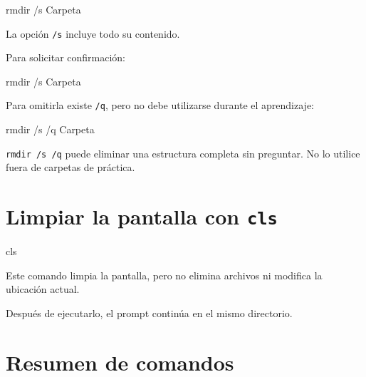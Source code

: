 \documentclass[
  spanish,
  letterpaper,
]{scrbook}
\newenvironment{Shaded}{\begin{snugshade}}{\end{snugshade}}
\newcommand{\AttributeTok}[1]{\textcolor[rgb]{0.40,0.45,0.13}{#1}}
\newcommand{\BuiltInTok}[1]{\textcolor[rgb]{0.00,0.23,0.31}{#1}}
\newcommand{\NormalTok}[1]{\textcolor[rgb]{0.00,0.23,0.31}{#1}}
\begin{document}
\begin{Shaded}
\begin{Highlighting}[]
\BuiltInTok{rmdir} \AttributeTok{/s}\NormalTok{ Carpeta}
\end{Highlighting}
\end{Shaded}

La opción \texttt{/s} incluye todo su contenido.

Para solicitar confirmación:

\begin{Shaded}
\begin{Highlighting}[]
\BuiltInTok{rmdir} \AttributeTok{/s}\NormalTok{ Carpeta}
\end{Highlighting}
\end{Shaded}

Para omitirla existe \texttt{/q}, pero no debe utilizarse durante el
aprendizaje:

\begin{Shaded}
\begin{Highlighting}[]
\BuiltInTok{rmdir} \AttributeTok{/s} \AttributeTok{/q}\NormalTok{ Carpeta}
\end{Highlighting}
\end{Shaded}

\texttt{rmdir\ /s\ /q} puede eliminar una estructura completa sin
preguntar. No lo utilice fuera de carpetas de práctica.


\chapter{\texorpdfstring{Limpiar la pantalla con
\texttt{cls}}{Limpiar la pantalla con cls}}\label{limpiar-la-pantalla-con-cls}

\begin{Shaded}
\begin{Highlighting}[]
\BuiltInTok{cls}
\end{Highlighting}
\end{Shaded}

Este comando limpia la pantalla, pero no elimina archivos ni modifica la
ubicación actual.

Después de ejecutarlo, el prompt continúa en el mismo directorio.


\chapter{Resumen de comandos}\label{resumen-de-comandos}
\end{document}
